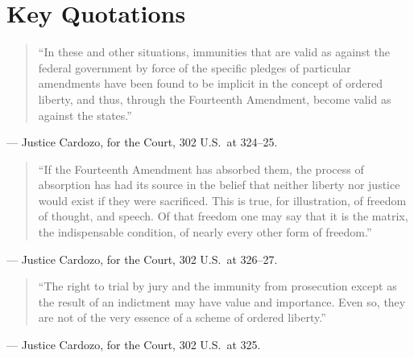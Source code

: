 \documentclass[12pt]{article}
\begin{document}
\section{Key Quotations}

\begin{quote}
``In these and other situations, immunities that are valid as against the federal government by force of the specific pledges of particular amendments have been found to be implicit in the concept of ordered liberty, and thus, through the Fourteenth Amendment, become valid as against the states.''
\end{quote}
\noindent --- Justice Cardozo, for the Court, 302 U.S.\ at 324--25.

\begin{quote}
``If the Fourteenth Amendment has absorbed them, the process of absorption has had its source in the belief that neither liberty nor justice would exist if they were sacrificed. This is true, for illustration, of freedom of thought, and speech. Of that freedom one may say that it is the matrix, the indispensable condition, of nearly every other form of freedom.''
\end{quote}
\noindent --- Justice Cardozo, for the Court, 302 U.S.\ at 326--27.

\begin{quote}
``The right to trial by jury and the immunity from prosecution except as the result of an indictment may have value and importance. Even so, they are not of the very essence of a scheme of ordered liberty.''
\end{quote}
\noindent --- Justice Cardozo, for the Court, 302 U.S.\ at 325.
\end{document}
